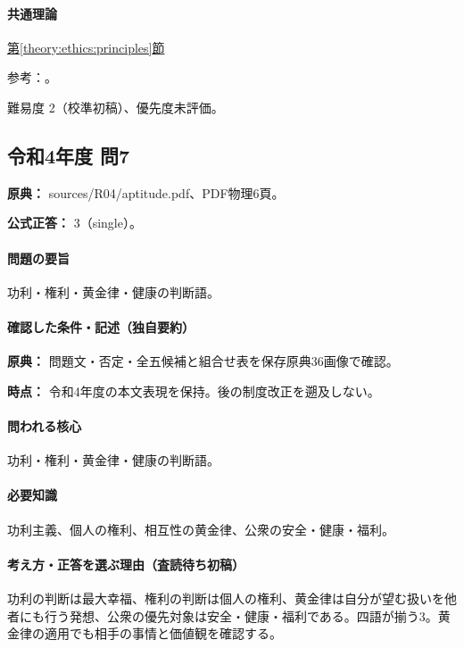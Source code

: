 \paragraph{共通理論} \hyperref[theory:ethics:principles]{第\ref*{theory:ethics:principles}節}

\par 参考：\cite{scu_ethics_framework}。

\par 難易度 2（校準初稿）、優先度未評価。

\subsection{令和4年度 問7}
\label{q:r04-reg-apt-07}

\noindent\textbf{原典：} sources/R04/aptitude.pdf、PDF物理6頁。

\textbf{公式正答：} 3（single）。

\paragraph{問題の要旨} 功利・権利・黄金律・健康の判断語。

\paragraph{確認した条件・記述（独自要約）}\mbox{}\par

\noindent\textbf{原典：} 問題文・否定・全五候補と組合せ表を保存原典36画像で確認。\par

\noindent\textbf{時点：} 令和4年度の本文表現を保持。後の制度改正を遡及しない。\par

\paragraph{問われる核心} 功利・権利・黄金律・健康の判断語。

\paragraph{必要知識} 功利主義、個人の権利、相互性の黄金律、公衆の安全・健康・福利。

\paragraph{考え方・正答を選ぶ理由（査読待ち初稿）} 功利の判断は最大幸福、権利の判断は個人の権利、黄金律は自分が望む扱いを他者にも行う発想、公衆の優先対象は安全・健康・福利である。四語が揃う3。黄金律の適用でも相手の事情と価値観を確認する。

